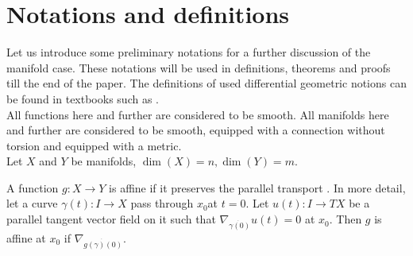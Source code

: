 \documentclass[twocolumn]{svjour3}          %
\newcommand{\CovariantDeriv}[1]{\nabla_{#1}}
\begin{document}
\section{Notations and definitions}
Let us introduce some preliminary notations for a further discussion of the manifold case. These notations will be used in definitions, theorems and proofs till the end of the paper. The definitions of used differential geometric notions can be found in textbooks such as \cite{DiffGeom}.
\\
All functions here and further are considered to be smooth. All manifolds here and further are considered to be smooth, equipped with a connection without torsion and equipped with a metric.
\\
Let $X$ and $Y$ be manifolds, $\dim(X)=n, \dim(Y)=m$.

\begin{definition} \label{Affine}
A function $g:X \to Y$ is affine if it preserves the parallel transport \cite{GeodesicMaps}. In more detail, let a curve $\gamma(t): I \to X$ pass through $x_0$at $t = 0$. Let $u(t):I \to TX$ be a parallel tangent vector field on it such that $\CovariantDeriv{\dot{\gamma(0)}} u(t) = 0$ at $x_0$. Then $g$ is affine at $x_0$ if $\CovariantDeriv{\dot{g(\gamma)(0)}}$.
\end{definition}
\end{document}
